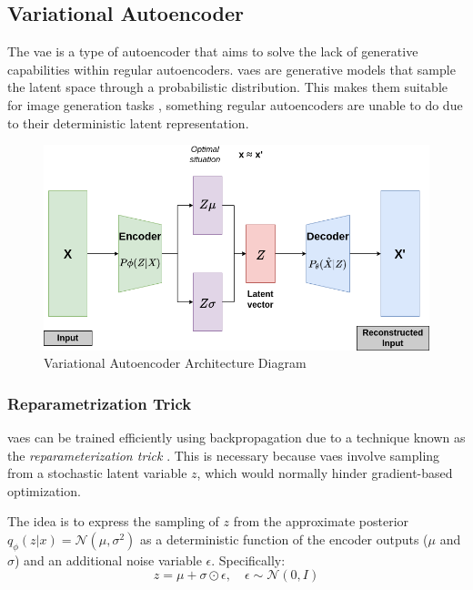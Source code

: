 \subsection{Variational Autoencoder}
\label{back:vae}

The \acrfull{vae} \cite{kingma2022autoencodingvariationalbayes} is a type of autoencoder that aims to solve the lack of generative capabilities within regular autoencoders. \acrshort{vae}s are generative models that sample the latent space through a probabilistic distribution. This makes them suitable for image generation tasks \cite{vahdat2020nvae}, something regular autoencoders are unable to do due to their deterministic latent representation.

\begin{figure}[!h]
    \centering
    \includegraphics[scale=0.4]{figures/vae.png}
    \caption{Variational Autoencoder Architecture Diagram}
    \label{fig:vaediagram}
\end{figure}


\subsubsection{Reparametrization Trick}
\label{back:reparam}

\acrshort{vae}s can be trained efficiently using backpropagation due to a technique known as the \textit{reparameterization trick} \cite{kingma2022autoencodingvariationalbayes}. This is necessary because \acrshort{vae}s involve sampling from a stochastic latent variable $z$, which would normally hinder gradient-based optimization.

The idea is to express the sampling of $z$ from the approximate posterior $q_\phi(z|x) = \mathcal{N}(\mu, \sigma^2)$ as a deterministic function of the encoder outputs ($\mu$ and $\sigma$) and an additional noise variable $\epsilon$. Specifically:
\begin{equation}
    z = \mu + \sigma \odot \epsilon, \quad \epsilon \sim \mathcal{N}(0, I)
\end{equation}

